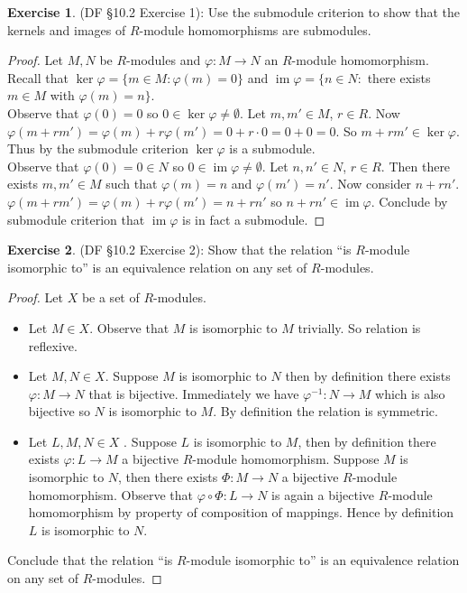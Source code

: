 \documentclass[8pt]{amsart}
\theoremstyle{plain}%
\theoremstyle{definition}
\newtheorem{exercise}{Exercise}[section]
\theoremstyle{remark}
\numberwithin{equation}{section}
\newcommand{\im}{\operatorname{im}}
\begin{document}
\begin{exercise}
(DF \S 10.2 Exercise 1): Use the submodule criterion to show that the kernels and images of $R$-module homomorphisms are submodules.
	\begin{proof}
		Let $M, N$ be $R$-modules and $\varphi : M \to N$ an $R$-module homomorphism. Recall that $\ker \varphi = \{m \in M : \varphi(m) = 0\}$ and $\im \varphi = \{n \in N : $ there exists $m \in M$ with $\varphi(m) = n\}$.\\

		Observe that $\varphi(0) = 0$ so $0 \in \ker \varphi \neq \emptyset$. Let $m, m' \in M$, $r \in R$. Now $\varphi(m + rm') = \varphi(m) + r\varphi(m') = 0 + r \cdot 0 = 0 + 0 = 0$. So $m + rm' \in \ker \varphi$. Thus by the submodule criterion $\ker \varphi$ is a submodule.\\

		Observe that $\varphi(0) = 0 \in N$ so $0 \in \im \varphi \neq \emptyset$. Let $n, n' \in N$, $r \in R$. Then there exists $m, m' \in M$ such that $\varphi(m) = n$ and $\varphi(m') = n'$. Now consider $n + rn'$. $\varphi(m + rm') = \varphi(m) + r\varphi(m') = n + rn'$ so $n + rn' \in \im \varphi$. Conclude by submodule criterion that $\im \varphi$ is in fact a submodule.
	\end{proof}
\end{exercise}

\begin{exercise}
(DF \S 10.2 Exercise 2): Show that the relation ``is $R$-module isomorphic to'' is an equivalence relation on any set of $R$-modules.
	\begin{proof}
		Let $X$ be a set of $R$-modules.
		\begin{itemize}
			\item Let $M \in X$. Observe that $M$ is isomorphic to $M$ trivially. So relation is reflexive.
			\item Let $M, N \in X$. Suppose $M$ is isomorphic to $N$ then by definition there exists $\varphi : M \to N$ that is bijective. Immediately we have $\varphi^{-1} : N \to M$ which is also bijective so $N$ is isomorphic to $M$. By definition the relation is symmetric.
			\item Let $L, M, N \in X$ . Suppose $L$ is isomorphic to $M$, then by definition there exists $\varphi : L \to M$ a bijective $R$-module homomorphism. Suppose $M$ is isomorphic to $N$, then there exists $\Phi : M \to N$ a bijective $R$-module homomorphism. Observe that $\varphi \circ \Phi : L \to N$ is again a bijective $R$-module homomorphism by property of composition of mappings. Hence by definition $L$ is isomorphic to $N$.
		\end{itemize}
		Conclude that the relation ``is $R$-module isomorphic to'' is an equivalence relation on any set of $R$-modules.
	\end{proof}
\end{exercise}
\end{document}
